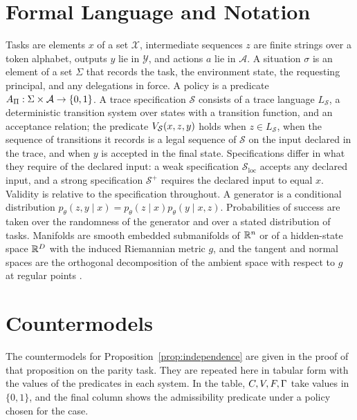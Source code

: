 \chapter{Formal Language and Notation}
\label{app:notation}

Tasks are elements $x$ of a set $\mathcal X$, intermediate sequences $z$ are finite strings over a token alphabet, outputs $y$ lie in $\mathcal Y$, and actions $a$ lie in $\mathcal A$. A situation $\sigma$ is an element of a set $\Sigma$ that records the task, the environment state, the requesting principal, and any delegations in force. A policy is a predicate $A_\Pi:\Sigma\times\mathcal A\to\{0,1\}$. A trace specification $\mathcal S$ consists of a trace language $L_{\mathcal S}$, a deterministic transition system over states with a transition function, and an acceptance relation; the predicate $V_{\mathcal S}(x,z,y)$ holds when $z\in L_{\mathcal S}$, when the sequence of transitions it records is a legal sequence of $\mathcal S$ on the input declared in the trace, and when $y$ is accepted in the final state. Specifications differ in what they require of the declared input: a weak specification $\mathcal S_{\mathrm{loc}}$ accepts any declared input, and a strong specification $\mathcal S^+$ requires the declared input to equal $x$. Validity is relative to the specification throughout. A generator is a conditional distribution $p_\theta(z,y\mid x)=p_\theta(z\mid x)p_\theta(y\mid x,z)$. Probabilities of success are taken over the randomness of the generator and over a stated distribution of tasks. Manifolds are smooth embedded submanifolds of $\mathbb{R}^n$ or of a hidden-state space $\mathbb{R}^D$ with the induced Riemannian metric $g$, and the tangent and normal spaces are the orthogonal decomposition of the ambient space with respect to $g$ at regular points \cite{lee2013}.

\chapter{Countermodels}
\label{app:countermodels}

The countermodels for Proposition~\ref{prop:independence} are given in the proof of that proposition on the parity task. They are repeated here in tabular form with the values of the predicates in each system. In the table, $C,V,F,\Gamma$ take values in $\{0,1\}$, and the final column shows the admissibility predicate under a policy chosen for the case.

